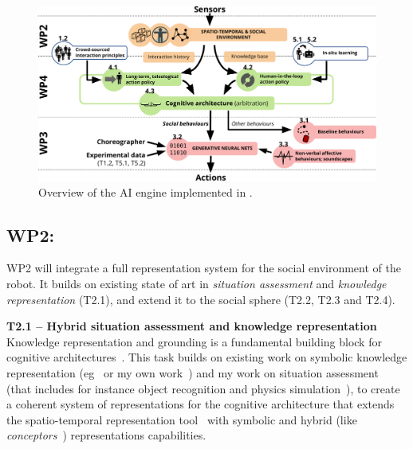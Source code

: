 \begin{figure}[h!]
\centering
\includegraphics[width=0.8\linewidth]{figs/archi}
\caption{Overview of the AI engine implemented in \project.}
\label{fig:archi}
\end{figure}



\subsection{WP2: \textbf{\wpTwo}}

WP2 will integrate a full representation system for the social environment of
the robot. It builds on existing state of art in \emph{situation assessment} and
\emph{knowledge representation} (T2.1), and extend it to the social sphere
(T2.2, T2.3 and T2.4).

\textbf{T2.1 -- Hybrid situation assessment and knowledge representation}
Knowledge representation and grounding is a fundamental building block for
cognitive architectures~\cite{lemaignan2017artificial,beetz2010cram}. This task
builds on existing work on symbolic knowledge representation
(eg~\cite{tenorth2009knowrob} or my own work~\cite{lemaignan2010oro}) and my
work on situation assessment~\cite{lemaignan2018underworlds} (that includes for
instance object recognition and physics
simulation~\cite{sallami2019simulation}), to create a coherent system of
representations for the cognitive architecture that extends the 
spatio-temporal representation tool~\cite{lemaignan2018underworlds} with
symbolic and hybrid (like \emph{conceptors}~\cite{jaeger2014controlling})
representations capabilities.

